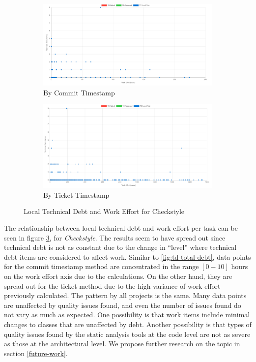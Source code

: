 \documentclass{mpaper}
\begin{document}
\begin{figure}
	\centering
	\begin{subfigure}{.45\textwidth}
		\includegraphics[width=\linewidth]{images/checkstyle_local_debt_commit.png}
		\caption{By Commit Timestamp}
		\label{fig:collections-td-timeline}
	\end{subfigure}
	\begin{subfigure}{.45\textwidth}
		\includegraphics[width=\linewidth]{images/checkstyle_local_debt_ticket.png}
		\caption{By Ticket Timestamp}
		\label{fig:spring-td-timeline}
	\end{subfigure}
	\caption{Local Technical Debt and Work Effort for Checkstyle}
	\label{fig:td-local-debt}
\end{figure}

The relationship between local technical debt and work effort per task can be
seen in figure \ref{fig:td-local-debt}, for \emph{Checkstyle}. The results seem
to have spread out since technical debt is not as constant due to the change in
``level'' where technical debt items are considered to affect work. Similar to
\ref{fig:td-total-debt}, data points for the commit timestamp method are
concentrated in the range $[0-10]$ hours on the work effort axis due to the
calculations. On the other hand, they are spread out for the ticket method due
to the high variance of work effort previously calculated. The pattern by all
projects is the same. Many data points are unaffected by quality issues found,
and even the number of issues found do not vary as much as expected. One
possibility is that work items include minimal changes to classes that are
unaffected by debt. Another possibility is that types of quality issues found by
the static analysis tools at the code level are not as severe as those at the
architectural level. We propose further research on the topic in section
\ref{future-work}. 
\end{document}
